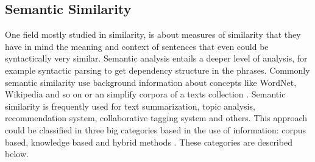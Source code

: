 \documentclass[12pt]{report}
\begin{document}
\subsection{Semantic Similarity} \label{sem_sim}
One field mostly studied in similarity, is about measures of similarity that they have in mind the meaning and context of sentences that even could be syntactically very similar. Semantic analysis entails a deeper level of analysis, for example syntactic parsing to get dependency structure in the phrases. Commonly semantic similarity use background information about concepts like WordNet, Wikipedia and so on or an simplify corpora of a texts collection \cite{Ganesan2015} \cite{ Zhang2015}.
Semantic similarity is frequently used for text summarization, topic analysis, recommendation system, collaborative tagging system and others. This approach could be classified in three big categories based in the use of information: corpus based,  knowledge based and hybrid methods \cite{Gomaa2013} \cite{Zhang2015}. These categories are described below.
\end{document}
